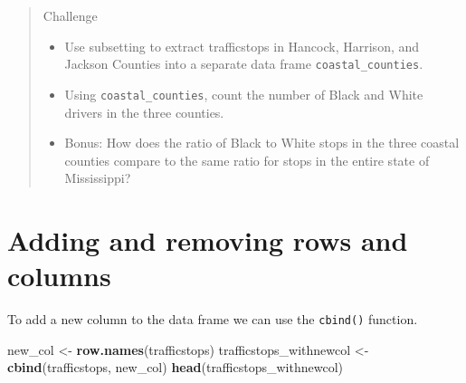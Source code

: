 \documentclass[
]{book}
\newenvironment{Shaded}{\begin{snugshade}}{\end{snugshade}}
\newcommand{\KeywordTok}[1]{\textcolor[rgb]{0.13,0.29,0.53}{\textbf{#1}}}
\newcommand{\NormalTok}[1]{#1}
\newcommand{\StringTok}[1]{\textcolor[rgb]{0.31,0.60,0.02}{#1}}
\providecommand{\tightlist}{%
  \setlength{\itemsep}{0pt}\setlength{\parskip}{0pt}}
\begin{document}
\begin{quote}
Challenge

\begin{itemize}
\tightlist
\item
  Use subsetting to extract trafficstops in Hancock, Harrison, and Jackson Counties into a separate data frame \texttt{coastal\_counties}.
\item
  Using \texttt{coastal\_counties}, count the number of Black and White drivers in the three counties.
\item
  Bonus: How does the ratio of Black to White stops in the three coastal counties compare to the same ratio for stops in the entire state of Mississippi?
\end{itemize}
\end{quote}

\hypertarget{adding-and-removing-rows-and-columns}{%
\section{Adding and removing rows and columns}\label{adding-and-removing-rows-and-columns}}

To add a new column to the data frame we can use the \texttt{cbind()} function.

\begin{Shaded}
\begin{Highlighting}[]
\NormalTok{new_col <-}\StringTok{ }\KeywordTok{row.names}\NormalTok{(trafficstops)}
\NormalTok{trafficstops_withnewcol <-}\StringTok{ }\KeywordTok{cbind}\NormalTok{(trafficstops, new_col)}
\KeywordTok{head}\NormalTok{(trafficstops_withnewcol)}
\end{Highlighting}
\end{Shaded}
\end{document}
